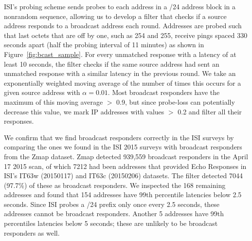 ISI's probing scheme sends
probes to each address in a /24 address block in a nonrandom sequence,
allowing us to develop a filter that checks if a source address responds
to a broadcast address each round.
%
Addresses are probed such that last octets that are off by one, such
as 254 and 255, receive pings spaced 330 seconds apart (half the
probing interval of 11 minutes) as shown in Figure~\ref{fig:bcast_sample}.
%
%
For every unmatched response with a latency of at least 10 seconds,
the filter checks if the same source address had sent an unmatched
response with a similar latency in the previous round.
%
We take an exponentially weighted moving average of the number of times
this occurs for a given source address with $\alpha=0.01$.
%
Most broadcast responders have the
maximum of this moving average $>$ 0.9, but since probe-loss can
potentially decrease this value, we mark IP addresses with values $>$
0.2 and filter all their responses. 
%

We confirm that we find broadcast responders correctly in the
ISI surveys by comparing the ones we found in the ISI 2015 surveys
with broadcast responders from the Zmap dataset.
%
%
%
%
Zmap detected 939,559 broadcast responders in the April 17
2015 scan, of which 7212 had been
addresses that provided Echo Responses in ISI's IT63w (20150117) and
IT63c (20150206) datasets.
%
The filter detected 7044 (97.7\%) of these as broadcast responders. 
We inspected the 168 remaining addresses and found that 154 addresses
have 99th percentile latencies below 2.5 seconds. Since ISI
probes a /24 prefix only once every 2.5 seconds, these addresses
cannot be broadcast responders. Another 5 addresses have 99th
percentiles latencies below 5 seconds; these are unlikely to be
broadcast responders as well.

